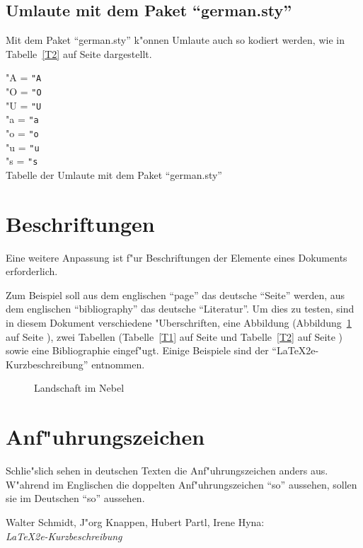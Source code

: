 \documentclass[11pt]{report} %
\begin{document}
\subsection{Umlaute mit dem Paket "`german.sty"'}
Mit dem Paket "`german.sty"' k"onnen Umlaute auch so kodiert werden, wie
in Tabelle~\ref{T2} auf Seite \pageref{T2} dargestellt.
\begin{table}[ht]
"A = \verb|"A|\\
"O = \verb|"O|\\
"U = \verb|"U|\\
"a = \verb|"a|\\
"o = \verb|"o|\\
"u = \verb|"u|\\
"s = \verb|"s|\\
\caption{Tabelle der Umlaute mit dem Paket "`german.sty"'} 
\label{T2}
\end{table}

\section{Beschriftungen}

Eine weitere Anpassung ist f"ur Beschriftungen der Elemente eines
Dokuments erforderlich. 

Zum Beispiel soll aus dem englischen "`page"' das deutsche "`Seite"'
werden, aus dem englischen "`bibliography"' das deutsche "`Literatur"'.
Um dies zu testen, sind in diesem Dokument verschiedene "Uberschriften,
eine Abbildung (Abbildung~\ref{A1} auf Seite \pageref{A1}), zwei
Tabellen (Tabelle~\ref{T1} auf Seite \pageref{T1} und Tabelle~\ref{T2}
auf Seite \pageref{T2}) sowie eine Bibliographie eingef"ugt. Einige
Beispiele sind der "`LaTeX2e-Kurzbeschreibung"' \cite{l2kurz} entnommen.


\begin{figure}[tb]
\vspace{4cm}
\caption{Landschaft im Nebel} 
\label{A1}
\end{figure}

\section{Anf"uhrungszeichen}

Schlie"slich sehen in deutschen Texten die Anf"uhrungszeichen anders
aus. W"ahrend im Englischen die doppelten Anf"uhrungszeichen ``so''
aussehen, sollen sie im Deutschen "`so"' aussehen. 


\begin{thebibliography}{9} 
 
Walter Schmidt, J"org Knappen, Hubert Partl, Irene Hyna:\\
\textit{LaTeX2e-Kurzbeschreibung}


\end{thebibliography}
 
\end{document}
